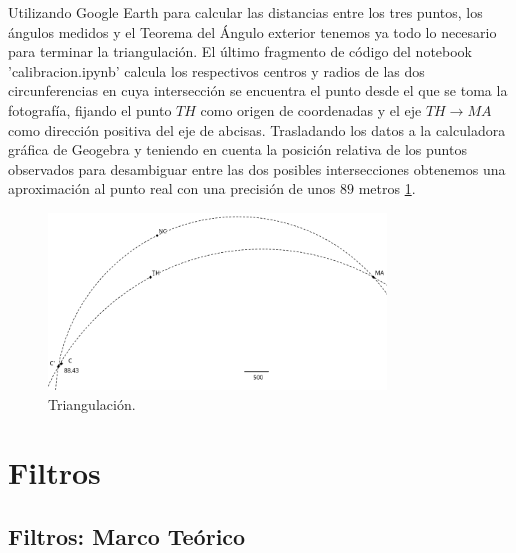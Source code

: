 \documentclass[12pt]{article}
\begin{document}
Utilizando Google Earth para calcular las distancias entre los tres puntos, los ángulos medidos y el Teorema del Ángulo exterior tenemos ya todo lo necesario para terminar la triangulación.
El último fragmento de código del notebook 'calibracion.ipynb' calcula los respectivos centros y radios de las dos circunferencias en cuya intersección se encuentra el punto desde el que se toma la fotografía, fijando el punto $TH$ como origen de coordenadas y el eje $TH \rightarrow MA$ como dirección positiva del eje de abcisas.
Trasladando los datos a la calculadora gráfica de Geogebra y teniendo en cuenta la posición relativa de los puntos observados para desambiguar entre las dos posibles intersecciones obtenemos una aproximación al punto real con una precisión de unos $89$ metros \ref{fig:geogebra_triangulacion}.
\begin{figure}[H]
    \centering
    \includegraphics[width=0.8\textwidth]{images_calibracion/Triangulacion_Geogebra.png} 
    \caption{Triangulación.}
    \label{fig:geogebra_triangulacion}
\end{figure}

\newpage

\section{Filtros}

\subsection{Filtros: Marco Teórico}
\end{document}
